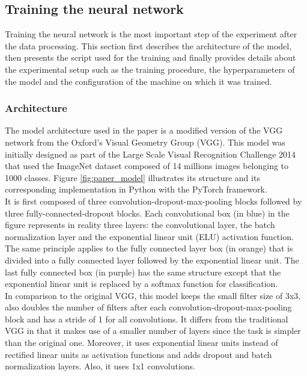 \subsection{Training the neural network}

\setlength{\marginparwidth}{3cm}\leavevmode {}Training the neural network is the most important step of the experiment after the data processing. This section first describes the architecture of the model, then presents the script used for the training and finally provides details about the experimental setup such as the training procedure, the hyperparameters of the model and the configuration of the machine on which it was trained.

\subsubsection{Architecture}
\setlength{\marginparwidth}{3cm}\leavevmode {}The model architecture used in the paper is a modified version of the VGG network from the Oxford's Visual Geometry Group (VGG). This model was initially designed as part of the Large Scale Visual Recognition Challenge 2014 that used the ImageNet dataset composed of 14 millions images belonging to 1000 classes. Figure \ref{fig:paper_model} illustrates its structure and its corresponding implementation in Python with the PyTorch framework.\\
It is first composed of three convolution-dropout-max-pooling blocks followed by three fully-connected-dropout blocks. Each convolutional box (in blue) in the figure represents in reality three layers: the convolutional layer, the batch normalization layer and the exponential linear unit (ELU) activation function. The same principle applies to the fully connected layer box (in orange) that is divided into a fully connected layer followed by the exponential linear unit. The last fully connected box (in purple) has the same structure except that the exponential linear unit is replaced by a softmax function for classification.\\
In comparison to the original VGG, this model keeps the small filter size of 3x3, also doubles the number of filters after each convolution-dropout-max-pooling block and has a stride of 1 for all convolutions. It differs from the traditional VGG in that it makes use of a smaller number of layers since the task is simpler than the original one. Moreover, it uses exponential linear units instead of rectified linear units as activation functions and adds dropout and batch normalization layers. Also, it uses 1x1 convolutions. 

